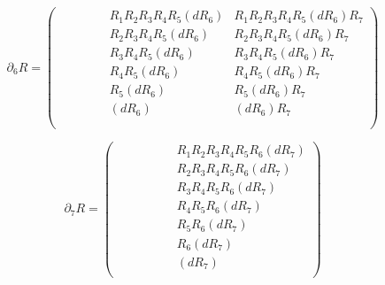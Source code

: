 {\begin{equation*}
    \partial_6 R =
    \begin{pmatrix}
            &         &             &                 &                     & R_1 R_2 R_3 R_4 R_5 (dR_6) & R_1 R_2 R_3 R_4 R_5 (dR_6) R_7 \\
            &         &             &                 &                     &     R_2 R_3 R_4 R_5 (dR_6) &     R_2 R_3 R_4 R_5 (dR_6) R_7 \\
            &         &             &                 &                     &         R_3 R_4 R_5 (dR_6) &         R_3 R_4 R_5 (dR_6) R_7 \\
            &         &             &                 &                     &             R_4 R_5 (dR_6) &             R_4 R_5 (dR_6) R_7 \\
            &         &             &                 &                     &                 R_5 (dR_6) &                 R_5 (dR_6) R_7 \\
            &         &             &                 &                     &                     (dR_6) &                     (dR_6) R_7 \\
            &         &             &                 &                     &                         &                                   \\
    \end{pmatrix}
\end{equation*}

\begin{equation*}
    \partial_7 R =
    \begin{pmatrix}
            &         &             &                 &                      &                         & R_1 R_2 R_3 R_4 R_5 R_6 (dR_7) \\
            &         &             &                 &                      &                         &     R_2 R_3 R_4 R_5 R_6 (dR_7) \\
            &         &             &                 &                      &                         &         R_3 R_4 R_5 R_6 (dR_7) \\
            &         &             &                 &                      &                         &             R_4 R_5 R_6 (dR_7) \\
            &         &             &                 &                      &                         &                 R_5 R_6 (dR_7) \\
            &         &             &                 &                      &                         &                     R_6 (dR_7) \\
            &         &             &                 &                      &                         &                         (dR_7) \\
    \end{pmatrix}
\end{equation*}



}
